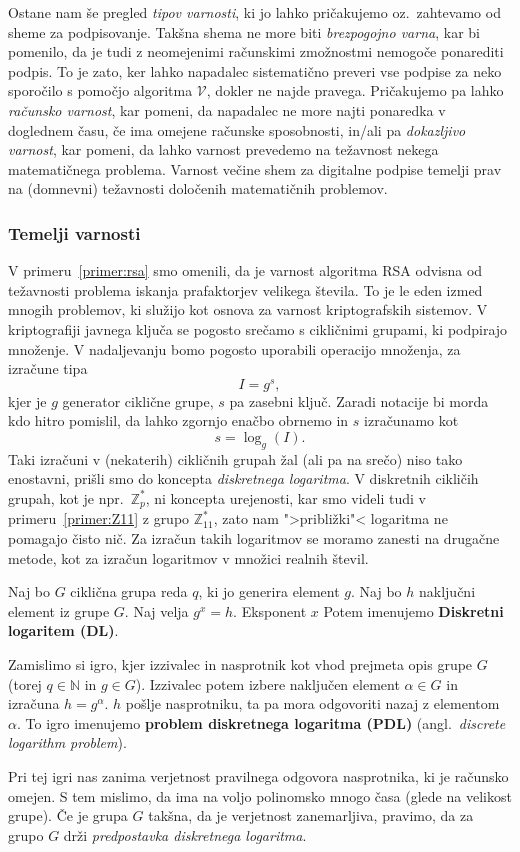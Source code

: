\documentclass[isrm2, tisk]{fmfdelo}
\newcommand{\N}{\mathbb N}
\newcommand{\Z}{\mathbb Z}
\begin{document}
Ostane nam še pregled \textit{tipov varnosti}, ki jo lahko pričakujemo oz.\ zahtevamo od sheme za
podpisovanje. Takšna shema ne more biti \textit{brezpogojno varna}, kar bi pomenilo, da je tudi z
neomejenimi računskimi zmožnostmi nemogoče ponarediti podpis. To je zato, ker lahko napadalec
sistematično preveri vse podpise za neko sporočilo s pomočjo algoritma $\mathcal{V}$, dokler ne najde
pravega. Pričakujemo pa lahko \textit{računsko varnost}, kar pomeni, da napadalec ne more najti
ponaredka v doglednem času, če ima omejene računske sposobnosti, in/ali pa \textit{dokazljivo varnost},
kar pomeni, da lahko varnost prevedemo na težavnost nekega matematičnega problema. Varnost večine
shem za digitalne podpise temelji prav na (domnevni) težavnosti določenih matematičnih problemov. 

\subsubsection{Temelji varnosti}
V primeru~\ref{primer:rsa} smo omenili, da je varnost algoritma RSA odvisna od težavnosti problema
iskanja prafaktorjev velikega števila. To je le eden izmed mnogih problemov, ki služijo kot osnova
za varnost kriptografskih sistemov. V kriptografiji javnega ključa se pogosto srečamo s cikličnimi
grupami, ki podpirajo množenje. V nadaljevanju bomo pogosto uporabili operacijo množenja, za izračune
tipa 
$$
I = g^s,
$$
kjer je $g$ generator ciklične grupe, $s$ pa zasebni ključ. Zaradi notacije bi morda kdo hitro pomislil,
da lahko zgornjo enačbo obrnemo in $s$ izračunamo kot 
$$ 
s = \log_g(I).
$$
Taki izračuni v (nekaterih) cikličnih grupah žal (ali pa na srečo) niso tako enostavni, prišli smo do
koncepta \textit{diskretnega logaritma}. V diskretnih cikličih grupah, kot je npr.\ $\Z_p^*$, ni koncepta
urejenosti, kar smo videli tudi v primeru~\ref{primer:Z11} z grupo $\Z_{11}^*$, zato nam ">približki"<
logaritma ne pomagajo čisto nič. Za izračun takih logaritmov se moramo zanesti na drugačne metode,
kot za izračun logaritmov v množici realnih števil.

\begin{definicija}
\label{def:dl}
    Naj bo $G$ ciklična grupa reda $q$, ki jo generira element $g$. Naj bo $h$ naključni element iz 
    grupe $G$. Naj velja $g^x = h$. Eksponent $x$ Potem imenujemo \textbf{Diskretni logaritem (DL)}.

    Zamislimo si igro, kjer izzivalec in nasprotnik kot vhod prejmeta opis grupe $G$ (torej $q \in \N$
    in $g \in G$). Izzivalec potem izbere naključen element $\alpha \in G$ in izračuna $h = g^{\alpha}$.
    $h$ pošlje nasprotniku, ta pa mora odgovoriti nazaj z elementom $\alpha$. To igro imenujemo 
    \textbf{problem diskretnega logaritma (PDL)} (angl.\ \textit{discrete logarithm problem}).

    Pri tej igri nas zanima verjetnost pravilnega odgovora nasprotnika, ki je računsko omejen. S tem 
    mislimo, da ima na voljo polinomsko mnogo časa (glede na velikost grupe). Če je grupa $G$ takšna, 
    da je verjetnost zanemarljiva, pravimo, da za grupo $G$ drži \textit{predpostavka diskretnega 
    logaritma}.
\end{definicija}
\end{document}
